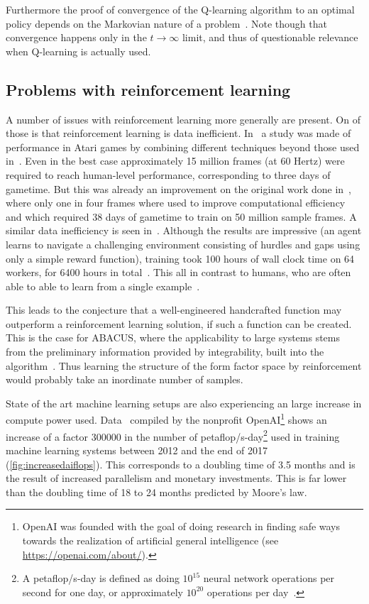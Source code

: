 \documentclass[11pt, a4paper]{report} %
\begin{document}
Furthermore the proof of convergence of the Q-learning algorithm to an optimal policy depends on the Markovian nature of a problem~\cite{watkins92_q_learn}.
Note though that convergence happens only in the \(t\to\infty\) limit, and thus of questionable relevance when Q-learning is actually used.


\subsection{Problems with reinforcement learning}


A number of issues with reinforcement learning more generally are present.
On of those is that reinforcement learning is data inefficient.
In~\cite{1710.02298} a study was made of performance in Atari games by combining different techniques beyond those used in~\cite{mnih13_playin_atari_with_deep_reinf_learn,mnih15_human_level_contr_throug_deep_reinf_learn}.
Even in the best case approximately 15 million frames (at 60 Hertz) were required to reach human-level performance, corresponding to three days of gametime.
But this was already an improvement on the original work done in~\cite{mnih15_human_level_contr_throug_deep_reinf_learn}, where only one in four frames where used to improve computational efficiency and which required 38 days of gametime to train on 50 million sample frames.
A similar data inefficiency is seen in~\cite{heess17_emerg_locom_behav_rich_envir}.
Although the results are impressive (an agent learns to navigate a challenging environment consisting of hurdles and gaps using only a simple reward function), training took 100 hours of wall clock time on 64 workers, for 6400 hours in total~\cite[Figure 1]{heess17_emerg_locom_behav_rich_envir}.
This all in contrast to humans, who are often able to able to learn from a single example~\cite{marcus18_deep_learn}.

This leads to the conjecture that a well-engineered handcrafted function may outperform a reinforcement learning solution, if such a function can be created.
This is the case for ABACUS, where the applicability to large systems stems from the preliminary information provided by integrability, built into the algorithm~\cite{Caux2009}.
Thus learning the structure of the form factor space by reinforcement would probably take an inordinate number of samples.

State of the art machine learning setups are also experiencing an large increase in compute power used.
Data~\cite{amodei2018} compiled by the nonprofit OpenAI\footnote{OpenAI was founded with the goal of doing research in finding safe ways towards the realization of artificial general intelligence (see \href{https://openai.com/about/}{https://openai.com/about/}).} shows an increase of a factor 300000 in the number of petaflop/s-day\footnote{A petaflop/s-day is defined as doing $10^{15}$ neural network operations per second for one day, or approximately $10^{20}$ operations per day~\cite{amodei2018}.} used in training machine learning systems between 2012 and the end of 2017 (\cref{fig:increasedaiflops}). 
This corresponds to a doubling time of 3.5 months and is the result of increased parallelism and monetary investments.
This is far lower than the doubling time of 18 to 24 months predicted by Moore's law.
\end{document}
